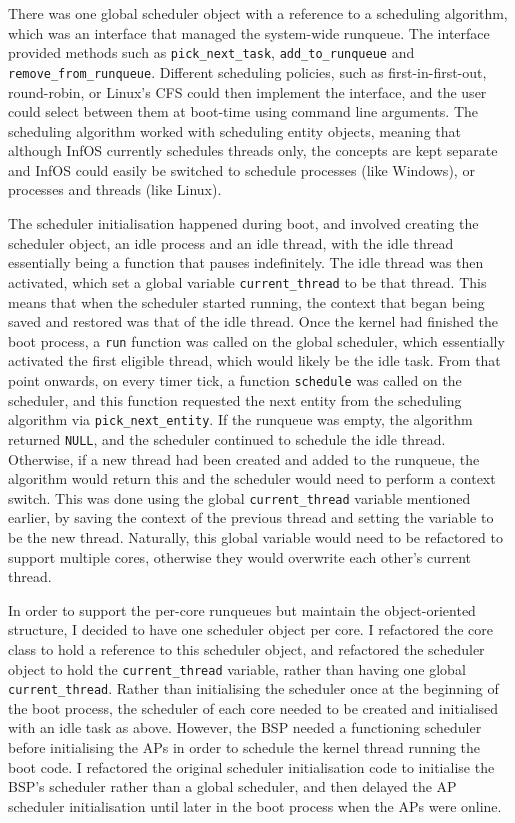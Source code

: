 \documentclass[bsc,frontabs,singlespacing,parskip,deptreport]{infthesis}
\begin{document}
There was one global scheduler object with a reference to a scheduling algorithm, which was an interface that managed the system-wide runqueue. The interface provided methods such as \verb|pick_next_task|, \verb|add_to_runqueue| and \verb|remove_from_runqueue|. Different scheduling policies, such as first-in-first-out, round-robin, or Linux's CFS could then implement the interface, and the user could select between them at boot-time using command line arguments. The scheduling algorithm worked with scheduling entity objects, meaning that although InfOS currently schedules threads only, the concepts are kept separate and InfOS could easily be switched to schedule processes (like Windows), or processes and threads (like Linux).

The scheduler initialisation happened during boot, and involved creating the scheduler object, an idle process and an idle thread, with the idle thread essentially being a function that pauses indefinitely. The idle thread was then activated, which set a global variable \verb|current_thread| to be that thread. This means that when the scheduler started running, the context that began being saved and restored was that of the idle thread. Once the kernel had finished the boot process, a \verb|run| function was called on the global scheduler, which essentially activated the first eligible thread, which would likely be the idle task. From that point onwards, on every timer tick, a function \verb|schedule| was called on the scheduler, and this function requested the next entity from the scheduling algorithm via \verb|pick_next_entity|. If the runqueue was empty, the algorithm returned \verb|NULL|, and the scheduler continued to schedule the idle thread. Otherwise, if a new thread had been created and added to the runqueue, the algorithm would return this and the scheduler would need to perform a context switch. This was done using the global \verb|current_thread| variable mentioned earlier, by saving the context of the previous thread and setting the variable to be the new thread. Naturally, this global variable would need to be refactored to support multiple cores, otherwise they would overwrite each other's current thread.

In order to support the per-core runqueues but maintain the object-oriented structure, I decided to have one scheduler object per core. I refactored the core class to hold a reference to this scheduler object, and refactored the scheduler object to hold the \verb|current_thread| variable, rather than having one global \verb|current_thread|. Rather than initialising the scheduler once at the beginning of the boot process, the scheduler of each core needed to be created and initialised with an idle task as above. However, the BSP needed a functioning scheduler before initialising the APs in order to schedule the kernel thread running the boot code. I refactored the original scheduler initialisation code to initialise the BSP's scheduler rather than a global scheduler, and then delayed the AP scheduler initialisation until later in the boot process when the APs were online.
\end{document}
